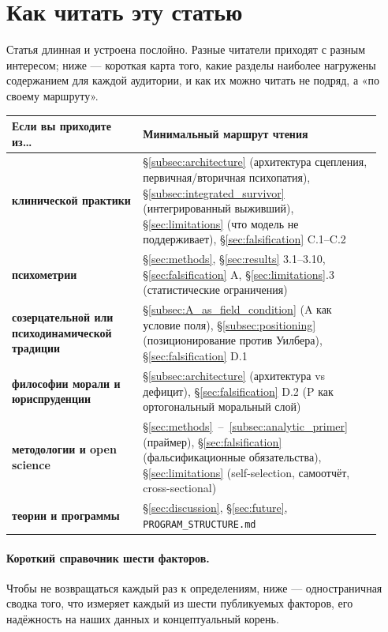 \section*{Как читать эту статью}
\label{sec:reading_guide}

Статья длинная и устроена послойно. Разные читатели приходят с разным интересом; ниже --- короткая карта того, какие разделы наиболее нагружены содержанием для каждой аудитории, и как их можно читать не подряд, а «по своему маршруту».

\begin{center}
\begin{tabular}{p{0.33\linewidth}p{0.60\linewidth}}
\toprule
\textbf{Если вы приходите из\dots} & \textbf{Минимальный маршрут чтения} \\
\midrule
\textbf{клинической практики} & §\ref{subsec:architecture} (архитектура сцепления, первичная/вторичная психопатия), §\ref{subsec:integrated_survivor} (интегрированный выживший), §\ref{sec:limitations} (что модель не поддерживает), §\ref{sec:falsification} C.1--C.2 \\
\midrule
\textbf{психометрии} & §\ref{sec:methods}, §\ref{sec:results} 3.1--3.10, §\ref{sec:falsification} A, §\ref{sec:limitations}.3 (статистические ограничения) \\
\midrule
\textbf{созерцательной или психодинамической традиции} & §\ref{subsec:A_as_field_condition} (A как условие поля), §\ref{subsec:positioning} (позиционирование против Уилбера), §\ref{sec:falsification} D.1 \\
\midrule
\textbf{философии морали и юриспруденции} & §\ref{subsec:architecture} (архитектура vs дефицит), §\ref{sec:falsification} D.2 (P как ортогональный моральный слой) \\
\midrule
\textbf{методологии и open science} & §\ref{sec:methods}~--~\ref{subsec:analytic_primer} (праймер), §\ref{sec:falsification} (фальсификационные обязательства), §\ref{sec:limitations} (self-selection, самоотчёт, cross-sectional) \\
\midrule
\textbf{теории и программы} & \S\ref{sec:discussion}, §\ref{sec:future}, \texttt{PROGRAM\_STRUCTURE.md} \\
\bottomrule
\end{tabular}
\end{center}

\paragraph{Короткий справочник шести факторов.} Чтобы не возвращаться каждый раз к определениям, ниже --- одностраничная сводка того, что измеряет каждый из шести публикуемых факторов, его надёжность на наших данных и концептуальный корень.

